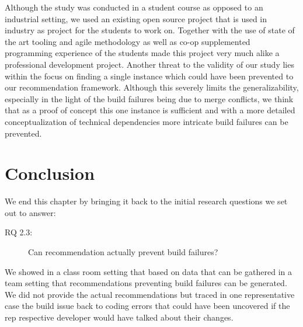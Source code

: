 Although the study was conducted in a student course as opposed to an industrial setting, we used an existing open source project that is used in industry as project for the students to work on.
Together with the use of state of the art tooling and agile methodology as well as co-op supplemented programming experience of the students made this project very much alike a professional development project.
Another threat to the validity of our study lies within the focus on finding a single instance which could have been prevented to our recommendation framework.
Although this severely limits the generalizability, especially in the light of the build failures being due to merge conflicts, we think that as a proof of concept this one instance is sufficient and with a more detailed conceptualization of technical dependencies more intricate build failures can be prevented.

\section{Conclusion}
We end this chapter by bringing it back to the initial research questions we set out to answer:
\begin{description}
  \item[RQ 2.3:] Can recommendation actually prevent build failures?
\end{description}

We showed in a class room setting that based on data that can be gathered in a team setting that recommendations preventing build failures can be generated.
We did not provide the actual recommendations but traced in one representative case the build issue back to coding errors that could have been uncovered if the rep respective developer would have talked about their changes.
